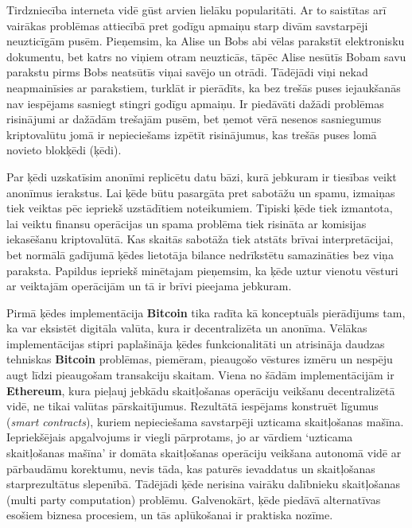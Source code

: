 Tirdzniecība interneta vidē gūst arvien lielāku popularitāti. 
Ar to saistītas arī vairākas problēmas attiecībā pret godīgu apmaiņu starp divām savstarpēji neuzticīgām pusēm. 
Pieņemsim, ka Alise un Bobs abi vēlas parakstīt elektronisku dokumentu, bet katrs no viņiem otram neuzticās, tāpēc Alise nesūtīs Bobam savu parakstu pirms Bobs neatsūtīs viņai savējo un otrādi. 
Tādējādi viņi nekad neapmainīsies ar parakstiem, turklāt ir pierādīts, ka bez trešās puses iejaukšanās nav iespējams sasniegt stingri godīgu apmaiņu.\cite{pagnia99}
Ir piedāvāti dažādi problēmas risinājumi ar dažādām trešajām pusēm, bet ņemot vērā nesenos sasniegumus kriptovalūtu jomā ir nepieciešams izpētīt risinājumus, kas trešās puses lomā novieto blokķēdi (ķēdi). 

Par ķēdi uzskatīsim anonīmi replicētu datu bāzi, kurā jebkuram ir tiesības veikt anonīmus ierakstus. Lai ķēde būtu pasargāta pret sabotāžu un spamu, izmaiņas tiek veiktas pēc iepriekš uzstādītiem noteikumiem.
Tipiski ķēde tiek izmantota, lai veiktu finansu operācijas un spama problēma tiek risināta ar komisijas iekasēšanu kriptovalūtā. Kas skaitās sabotāža tiek atstāts brīvai interpretācijai, bet normālā gadījumā ķēdes lietotāja bilance nedrīkstētu samazināties bez viņa paraksta. Papildus iepriekš minētajam pieņemsim, ka ķēde uztur vienotu vēsturi ar veiktajām operācijām un tā ir brīvi pieejama jebkuram.

Pirmā ķēdes implementācija \textbf{Bitcoin} tika radīta kā konceptuāls pierādījums tam, ka var eksistēt digitāla valūta, kura ir decentralizēta un anonīma. 
Vēlākas implementācijas stipri paplašināja ķēdes funkcionalitāti un atrisināja daudzas tehniskas \textbf{Bitcoin} problēmas, piemēram, pieaugošo vēstures izmēru un nespēju augt līdzi pieaugošam transakciju skaitam.\cite{barber12}
Viena no šādām implementācijām ir \textbf{Ethereum}, kura pieļauj jebkādu skaitļošanas operāciju veikšanu decentralizētā vidē, ne tikai valūtas pārskaitījumus.\cite{etherum}
Rezultātā iespējams konstruēt līgumus (\textit{smart contracts}), kuriem nepieciešama savstarpēji uzticama skaitļošanas mašīna.
Iepriekšējais apgalvojums ir viegli pārprotams, jo ar vārdiem `uzticama skaitļošanas mašīna' ir domāta skaitļošanas operāciju veikšana autonomā vidē ar pārbaudāmu korektumu, nevis tāda, kas paturēs ievaddatus un skaitļošanas starprezultātus slepenībā.
Tādējādi ķēde nerisina vairāku dalībnieku skaitļošanas (multi party computation) problēmu.
Galvenokārt, ķēde piedāvā alternatīvas esošiem biznesa procesiem, un tās aplūkošanai ir praktiska nozīme.


